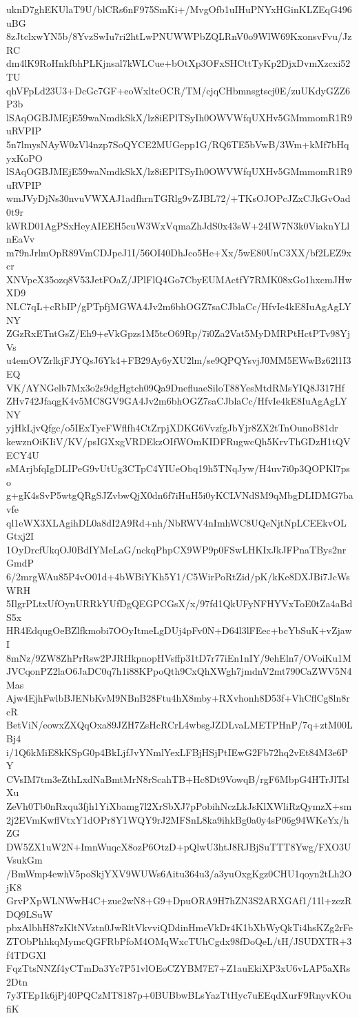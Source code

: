 uknD7ghEKUlaT9U/blCRs6nF975SmKi+/MvgOfb1uIHuPNYxHGinKLZEqG496uBG
8zJtclxwYN5b/8YvzSwIu7ri2htLwPNUWWPbZQLRnV0o9WlW69KxonsvFvu/JzRC
dm4lK9RoHnkfbhPLKjnsal7kWLCue+bOtXp3OFxSHCttTyKp2DjxDvmXzcxi52TU
qhVFpLd23U3+DcGc7GF+eoWxlteOCR/TM/cjqCHbmnsgtscj0E/zuUKdyGZZ6P3b
lSAqOGBJMEjE59waNmdkSkX/lz8iEPlTSyIh0OWVWfqUXHv5GMmmomR1R9uRVPIP
5n7lmysNAyW0zVl4nzp7SoQYCE2MUGepp1G/RQ6TE5bVwB/3Wm+kMf7bHqyxKoPO
lSAqOGBJMEjE59waNmdkSkX/lz8iEPlTSyIh0OWVWfqUXHv5GMmmomR1R9uRVPIP
wmJVyDjNs30nvuVWXAJ1adfhrnTGRlg9vZJBL72/+TKsOJOPcJZxCJkGvOad0t9r
kWRD01AgPSxHeyAIEEH5cuW3WxVqmaZhJdS0x43sW+24IW7N3k0ViaknYLlnEaVv
m79nJrlmOpR89VmCDJpeJ1I/56OI40DhJco5He+Xx/5wE80UnC3XX/bf2LEZ9xcr
XNVpeX35ozq8V53JetFOaZ/JPlFlQ4Go7CbyEUMActfY7RMK08xGo1hxcmJHwXD9
NLC7qL+cRbIP/gPTpfjMGWA4Jv2m6bhOGZ7saCJblaCc/HfvIe4kE8IuAgAgLYNY
ZGzRxETntGsZ/Eh9+eVkGpzs1M5tcO69Rp/7i0Za2Vat5MyDMRPtHctPTv98YjVs
u4emOVZrlkjFJYQsJ6Yk4+FB29Ay6yXU2lm/se9QPQYsvjJ0MM5EWwBz62l1I3EQ
VK/AYNGelb7Mx3o2s9dgHgtch09Qa9DnefluaeSiloT88YesMtdRMsYIQ8J317Hf
ZHv742JfaqgK4v5MC8GV9GA4Jv2m6bhOGZ7saCJblaCc/HfvIe4kE8IuAgAgLYNY
yjHkLjvQfgc/o5IExTyeFWflfh4CtZrpjXDKG6VvzfgJbYjr8ZX2tTnOunoB81dr
kewznOiKIiV/KV/psIGXxgVRDEkzOIfWOmKIDFRugwcQh5KrvThGDzH1tQVECY4U
sMArjbfqIgDLIPeG9vUtUg3CTpC4YIUeObq19h5TNqJyw/H4uv7i0p3QOPKl7pso
g+gK4sSvP5wtgQRgSJZvbwQjX0dn6f7iHuH5i0yKCLVNdSM9qMbgDLIDMG7bavfe
ql1eWX3XLAgihDL0a8dI2A9Rd+nh/NbRWV4nImhWC8UQeNjtNpLCEEkvOLGtxj2I
1OyDrcfUkqOJ0BdIYMeLaG/nckqPhpCX9WP9p0FSwLHKIxJkJFPnaTBys2nrGmdP
6/2mrgWAu85P4vO01d+4bWBiYKh5Y1/C5WirPoRtZid/pK/kKe8DXJBi7JcWsWRH
5IlgrPLtxUfOynURRkYUfDgQEGPCGsX/x/97fd1QkUFyNFHYVxToE0tZa4aBdS5x
HR4EdqugOeBZlfkmobi7OOyItmeLgDUj4pFv0N+D64l3lFEec+bcYbSuK+vZjawI
8mNz/9ZW8ZhPrRsw2PJRHkpnopHVsffp31tD7r77iEn1nIY/9ehEln7/OVoiKu1M
JVCqonPZ2laO6JaDC0q7h1i88KPpoQth9CxQhXWgh7jmdnV2mt790CaZWV5N4Mas
Ajw4EjhFwlbBJENbKvM9NBnB28Ftu4hX8mby+RXvhonh8D53f+VhCflCg8ln8rcR
BetViN/eowxZXQqOxa89JZH7ZsHcRCrL4wbsgJZDLvaLMETPHnP/7q+ztM00LBj4
i/1Q6kMiE8kKSpG0p4BkLjfJvYNmlYexLFBjHSjPtIEwG2Fb72hq2vEt84M3e6PY
CVsIM7tm3eZthLxdNaBmtMrN8rScahTB+Hc8Dt9VowqB/rgF6MbpG4HTrJlTslXu
ZeVh0Tb0nRxqu3fjh1YiXbamg7l2XrSbXJ7pPobihNczLkJsKlXWliRzQymzX+sm
2j2EVmKwflVtxY1dOPr8Y1WQY9rJ2MFSnL8ka9ihkBg0a0y4sP06g94WKeYx/hZG
DW5ZX1uW2N+ImnWuqcX8ozP6OtzD+pQlwU3htJ8RJBjSuTTT8Ywg/FXO3UVsukGm
/BmWmp4ewhV5poSkjYXV9WUWs6Aitu364u3/a3yuOxgKgz0CHU1qoyn2tLh2OjK8
GrvPXpWLNWwH4C+zue2wN8+G9+DpuORA9H7hZN3S2ARXGAf1/11l+zczRDQ9LSuW
pbxAlbhH87zKltNVztn0JwRltVkvviQDdinHmeVkDr4K1bXbWyQkTi4hsKZg2rFe
ZTObPhhkqMymcQGFRbPfoM4OMqWxcTUhCgdx98fDoQeL/tH/JSUDXTR+3f4TDGXl
FqzTtsNNZf4yCTmDa3Yc7P51vlOEoCZYBM7E7+Z1auEkiXP3xU6vLAP5aXRs2Dtn
7y3TEp1k6jPj40PQCzMT8187p+0BUBbwBLsYazTtHyc7uEEqdXurF9RnyvKOufiK
